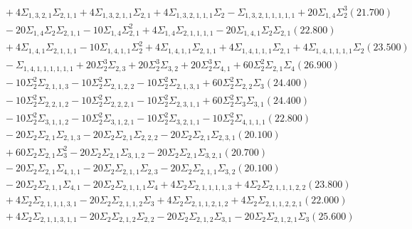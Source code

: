 \documentclass[12pt]{article}
\begin{document}
\begin{landscape}
\begin{align*}
		&\quad\quad +4\Sigma_{1,3,2,1}\Sigma_{2,1,1}+4\Sigma_{1,3,2,1,1}\Sigma_{2,1}+4\Sigma_{1,3,2,1,1,1}\Sigma_{2}-\Sigma_{1,3,2,1,1,1,1,1}+20\Sigma_{1,4}\Sigma_{2}^{3}(21.700) \\ 
		&\quad\quad -20\Sigma_{1,4}\Sigma_{2}\Sigma_{2,1,1}-10\Sigma_{1,4}\Sigma_{2,1}^{2}+4\Sigma_{1,4}\Sigma_{2,1,1,1,1}-20\Sigma_{1,4,1}\Sigma_{2}\Sigma_{2,1}(22.800) \\ 
		&\quad\quad +4\Sigma_{1,4,1}\Sigma_{2,1,1,1}-10\Sigma_{1,4,1,1}\Sigma_{2}^{2}+4\Sigma_{1,4,1,1}\Sigma_{2,1,1}+4\Sigma_{1,4,1,1,1}\Sigma_{2,1}+4\Sigma_{1,4,1,1,1,1}\Sigma_{2}(23.500) \\ 
		&\quad\quad -\Sigma_{1,4,1,1,1,1,1,1}+20\Sigma_{2}^{3}\Sigma_{2,3}+20\Sigma_{2}^{3}\Sigma_{3,2}+20\Sigma_{2}^{3}\Sigma_{4,1}+60\Sigma_{2}^{2}\Sigma_{2,1}\Sigma_{4}(26.900) \\ 
		&\quad\quad -10\Sigma_{2}^{2}\Sigma_{2,1,1,3}-10\Sigma_{2}^{2}\Sigma_{2,1,2,2}-10\Sigma_{2}^{2}\Sigma_{2,1,3,1}+60\Sigma_{2}^{2}\Sigma_{2,2}\Sigma_{3}(24.400) \\ 
		&\quad\quad -10\Sigma_{2}^{2}\Sigma_{2,2,1,2}-10\Sigma_{2}^{2}\Sigma_{2,2,2,1}-10\Sigma_{2}^{2}\Sigma_{2,3,1,1}+60\Sigma_{2}^{2}\Sigma_{3}\Sigma_{3,1}(24.400) \\ 
		&\quad\quad -10\Sigma_{2}^{2}\Sigma_{3,1,1,2}-10\Sigma_{2}^{2}\Sigma_{3,1,2,1}-10\Sigma_{2}^{2}\Sigma_{3,2,1,1}-10\Sigma_{2}^{2}\Sigma_{4,1,1,1}(22.800) \\ 
		&\quad\quad -20\Sigma_{2}\Sigma_{2,1}\Sigma_{2,1,3}-20\Sigma_{2}\Sigma_{2,1}\Sigma_{2,2,2}-20\Sigma_{2}\Sigma_{2,1}\Sigma_{2,3,1}(20.100) \\ 
		&\quad\quad +60\Sigma_{2}\Sigma_{2,1}\Sigma_{3}^{2}-20\Sigma_{2}\Sigma_{2,1}\Sigma_{3,1,2}-20\Sigma_{2}\Sigma_{2,1}\Sigma_{3,2,1}(20.700) \\ 
		&\quad\quad -20\Sigma_{2}\Sigma_{2,1}\Sigma_{4,1,1}-20\Sigma_{2}\Sigma_{2,1,1}\Sigma_{2,3}-20\Sigma_{2}\Sigma_{2,1,1}\Sigma_{3,2}(20.100) \\ 
		&\quad\quad -20\Sigma_{2}\Sigma_{2,1,1}\Sigma_{4,1}-20\Sigma_{2}\Sigma_{2,1,1,1}\Sigma_{4}+4\Sigma_{2}\Sigma_{2,1,1,1,1,3}+4\Sigma_{2}\Sigma_{2,1,1,1,2,2}(23.800) \\ 
		&\quad\quad +4\Sigma_{2}\Sigma_{2,1,1,1,3,1}-20\Sigma_{2}\Sigma_{2,1,1,2}\Sigma_{3}+4\Sigma_{2}\Sigma_{2,1,1,2,1,2}+4\Sigma_{2}\Sigma_{2,1,1,2,2,1}(22.000) \\ 
		&\quad\quad +4\Sigma_{2}\Sigma_{2,1,1,3,1,1}-20\Sigma_{2}\Sigma_{2,1,2}\Sigma_{2,2}-20\Sigma_{2}\Sigma_{2,1,2}\Sigma_{3,1}-20\Sigma_{2}\Sigma_{2,1,2,1}\Sigma_{3}(25.600) \\ 

\end{align*}
\end{landscape}
\end{document}
